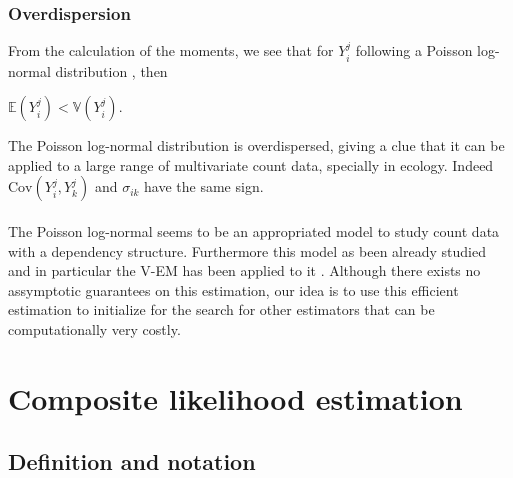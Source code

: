 \documentclass[11pt, a4paper]{article}
\begin{document}
\subsubsection{Overdispersion}
From the calculation of the moments, we see that for $Y^j_i$ following a Poisson log-normal distribution , then
\begin{center}
$\mathbb{E}(Y^j_i) < \mathbb{V}(Y^j_i)$.   
\end{center}
The Poisson log-normal distribution is overdispersed, giving a clue that it can be applied to a large range of multivariate count data, specially in ecology.
Indeed $\mathrm{Cov}(Y^j_i,Y^j_k)$ and $\sigma_{ik}$ have the same sign.\\
\\
The Poisson log-normal seems to be an appropriated model to study count data with a dependency structure. Furthermore this model as been already studied and in particular the V-EM has been applied to it \cite{chiquet2017variational}. Although there exists no assymptotic guarantees on this estimation, our idea is to use this efficient estimation to initialize for the search for other estimators that can be computationally very costly.
\section{Composite likelihood estimation}
\subsection{Definition and notation}
\end{document}
